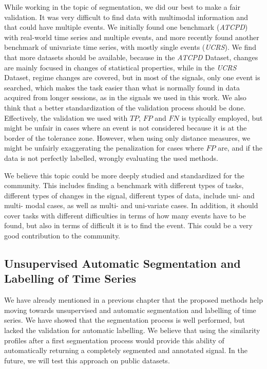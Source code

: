 While working in the topic of segmentation, we did our best to make a fair validation. It was very difficult to find data with multimodal information and that could have multiple events. We initially found one benchmark (\textit{ATCPD}) with real-world time series and multiple events, and more recently found another benchmark of univariate time series, with mostly single events (\textit{UCRS}). We find that more datasets should be available, because in the \textit{ATCPD} Dataset, changes are mainly focused in changes of statistical properties, while in the \textit{UCRS} Dataset, regime changes are covered, but in most of the signals, only one event is searched, which makes the task easier than what is normally found in data acquired from longer sessions, as in the signals we used in this work. We also think that a better standardization of the validation process should be done. Effectively, the validation we used with $TP$, $FP$ and $FN$ is typically employed, but might be unfair in cases where an event is not considered because it is at the border of the tolerance zone. However, when using only distance measures, we might be unfairly exaggerating the penalization for cases where $FP$ are, and if the data is not perfectly labelled, wrongly evaluating the used methods. 

We believe this topic could be more deeply studied and standardized for the community. This includes finding a benchmark with different types of tasks, different types of changes in the signal, different types of data, include uni- and multi- modal cases, as well as multi- and uni-variate cases. In addition, it should cover tasks with different difficulties in terms of how many events have to be found, but also in terms of difficult it is to find the event. This could be a very good contribution to the community.


\subsection{Unsupervised Automatic Segmentation and Labelling of Time Series}

We have already mentioned in a previous chapter that the proposed methods help moving towards unsupervised and automatic segmentation and labelling of time series. We have showed that the segmentation process is well performed, but lacked the validation for automatic labelling. We believe that using the similarity profiles after a first segmentation process would provide this ability of automatically returning a completely segmented and annotated signal. In the future, we will test this approach on public datasets.

